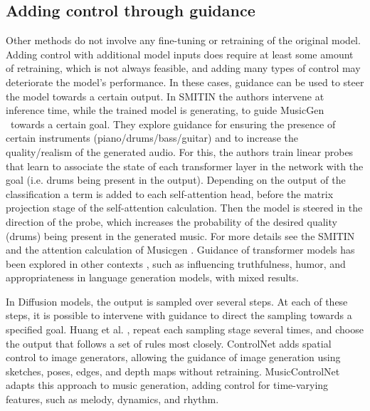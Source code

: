 \subsection{Adding control through guidance}
Other methods do not involve any fine-tuning or retraining of the original model. Adding control with additional model inputs does require at least some amount of retraining, which is not always feasible, and adding many types of control may deteriorate the model's performance. In these cases, guidance can be used to steer the model towards a certain output.
In SMITIN \cite{Koo_Wichern_Germain_SMITIN_2024} the authors intervene at inference time, while the trained model is generating, to guide MusicGen\cite{copet2023simple}  towards a certain goal. They explore guidance for ensuring the presence of certain instruments (piano/drums/bass/guitar) and to increase the quality/realism of the generated audio. For this, the authors train linear probes that learn to associate the state of each transformer layer in the network with the goal (i.e. drums being present in the output). Depending on the output of the classification a term is added to each self-attention head, before the matrix projection stage of the self-attention calculation. Then the model is steered in the direction of the probe, which increases the probability of the desired quality (drums) being present in the generated music. For more details see the SMITIN \cite{Koo_Wichern_Germain_SMITIN_2024} and the attention calculation of Musicgen \cite{copet2023simple}. Guidance of transformer models has been explored in other contexts \cite{language_guide_rutte_2024}, such as influencing truthfulness, humor, and appropriateness in language generation models, with mixed results. 

In Diffusion models, the output is sampled over several steps. At each of these steps, it is possible to intervene with guidance to direct the sampling towards a specified goal. Huang et al. \cite{Huang_rule_diffusion_2024}, repeat each sampling stage several times, and choose the output that follows a set of rules most closely. ControlNet \cite{Zhang_Rao_Agrawala_2023} adds spatial control to image generators, allowing the guidance of image generation using sketches, poses, edges, and depth maps without retraining. MusicControlNet \cite{Wu_Donahue_musicontrolnet_2023} adapts this approach to music generation, adding control for time-varying features, such as melody, dynamics, and rhythm. 

